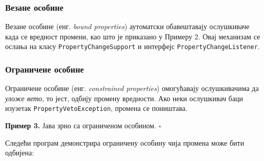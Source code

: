 \subsubsection{Везане особине}

Везане особине (енг. \textit{bound properties}) аутоматски обавештавају ослушкиваче када се вредност промени, као што је приказано у Примеру 2. Овај механизам се ослања на класу \texttt{PropertyChangeSupport} и интерфејс \texttt{PropertyChangeListener}.


\subsubsection{Ограничене особине}

Ограничене особине (енг. \textit{constrained properties}) омогућавају ослушкивачима да \textit{уложе вето}, то јест, одбију промену вредности. Ако неки ослушкивач баци изузетак \texttt{PropertyVetoException}, промена се поништава.


\bigskip

\noindent \textbf{Пример 3.} Јава зрно са ограниченом особином. $\square$

\medskip

Следећи програм демонстрира ограничену особину чија промена може бити одбијена:


